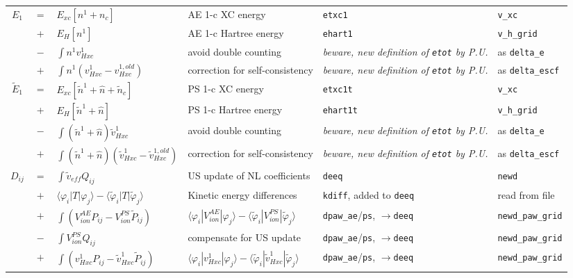 \documentclass[a4paper,twocolumn,12pt]{article}
\newcommand{\var}[1]{{\tt #1}}
\renewcommand{\phi}{\varphi}
\begin{document}
\begin{table*}
\begin{small}
\begin{tabular}{|c@{}c@{}l|p{4.5cm}|p{4.5cm}|p{4.0cm}|}
%
%
\hline $E_1$ &$=$& $E_{xc}[n^1+n_c]$ & AE 1-c XC energy & \var{etxc1} & \var{v\_xc} \\
%
$ $ &+& $E_{H}[n^1]$ & AE 1-c Hartree energy & \var{ehart1} & \var{v\_h\_grid} \\
%
$ $ &$-$& $\int{n^1 v_{Hxc}^{1}}$ & avoid double counting & {\em beware, new definition of \var{etot} by P.U.}& as \var{delta\_e} \\
%
$ $ &$+$& $\int{n^1 (v_{Hxc}^{1}-v_{Hxc}^{1,old})}$ & correction for self-consistency & {\em beware, new definition of \var{etot} by P.U.} & as \var{delta\_escf} \\
%
%
\hline $\tilde{E}_1$ &$=$& $E_{xc}[\tilde{n}^1+\hat{n}+\tilde{n}_c]$ & PS 1-c XC energy & \var{etxc1t} & \var{v\_xc} \\
%
$ $ &+& $E_{H}[\tilde{n}^1+\hat{n}]$ & PS 1-c Hartree energy & \var{ehart1t} & \var{v\_h\_grid} \\
%
$ $ &$-$& $\int{(\tilde{n}^1+\hat{n}) \tilde{v}_{Hxc}^{1}}$ & avoid double counting & {\em beware, new definition of \var{etot} by P.U.}& as \var{delta\_e} \\
%
$ $ &$+$& $\int{(\tilde{n}^1+\hat{n}) (\tilde{v}_{Hxc}^{1}-\tilde{v}_{Hxc}^{1,old})}$ & correction for self-consistency & {\em beware, new definition of \var{etot} by P.U.}& as \var{delta\_escf} \\
%
%
\hline $D_{ij}$ &$=$& $\int{\tilde{v}_{eff}Q_{ij}}$ & US update of NL coefficients & \var{deeq} & \var{newd} \\
%
$ $ &$+$& $\langle\phi_i|T|\phi_j\rangle-\langle\tilde{\phi}_i|T|\tilde{\phi}_j\rangle$ & Kinetic energy differences & \var{kdiff}, added to \var{deeq} & read from file \\
%
$ $ &$+$& $\int(V^{AE}_{ion}P_{ij}-V^{PS}_{ion}\tilde{P}_{ij})$ & $\langle\phi_i|V^{AE}_{ion}|\phi_j\rangle-\langle\tilde{\phi}_i|V^{PS}_{ion}|\tilde{\phi}_j\rangle$ & \var{dpaw\_ae}/\var{ps}, $\rightarrow$\var{deeq} & \var{newd\_paw\_grid}\\
%
$ $ &$-$& $\int{V^{PS}_{ion}Q_{ij}}$ & compensate for US update & \var{dpaw\_ae}/\var{ps}, $\rightarrow$\var{deeq} & \var{newd\_paw\_grid}\\
%
$ $ &$+$& $\int(v^1_{Hxc}P_{ij}-\tilde{v}^1_{Hxc}\tilde{P}_{ij})$ & $\langle\phi_i|v^1_{Hxc}|\phi_j\rangle-\langle\tilde{\phi}_i|\tilde{v}^1_{Hxc}|\tilde{\phi}_j\rangle$ & \var{dpaw\_ae}/\var{ps}, $\rightarrow$\var{deeq} & \var{newd\_paw\_grid}\\

\end{tabular}
\end{small}
\end{table*}
\end{document}
